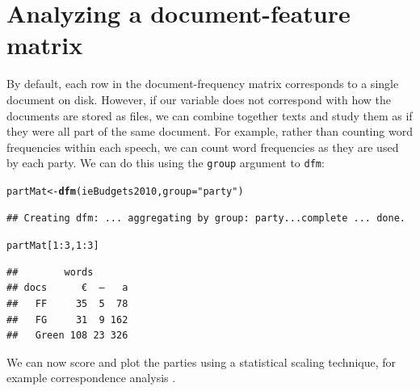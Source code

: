 \documentclass[11pt]{article}\usepackage[]{graphicx}\usepackage[]{color}
\makeatletter
\newcommand{\hlnum}[1]{\textcolor[rgb]{0.686,0.059,0.569}{#1}}%
\newcommand{\hlstr}[1]{\textcolor[rgb]{0.192,0.494,0.8}{#1}}%
\newcommand{\hlopt}[1]{\textcolor[rgb]{0,0,0}{#1}}%
\newcommand{\hlstd}[1]{\textcolor[rgb]{0.345,0.345,0.345}{#1}}%
\newcommand{\hlkwb}[1]{\textcolor[rgb]{0.69,0.353,0.396}{#1}}%
\newcommand{\hlkwc}[1]{\textcolor[rgb]{0.333,0.667,0.333}{#1}}%
\newcommand{\hlkwd}[1]{\textcolor[rgb]{0.737,0.353,0.396}{\textbf{#1}}}%
\newenvironment{kframe}{%
 \def\at@end@of@kframe{}%
 \ifinner\ifhmode%
  \def\at@end@of@kframe{\end{minipage}}%
  \begin{minipage}{\columnwidth}%
 \fi\fi%
 \def\FrameCommand##1{\hskip\@totalleftmargin \hskip-\fboxsep
 \colorbox{shadecolor}{##1}\hskip-\fboxsep
     \hskip-\linewidth \hskip-\@totalleftmargin \hskip\columnwidth}%
 \MakeFramed {\advance\hsize-\width
   \@totalleftmargin\z@ \linewidth\hsize
   \@setminipage}}%
 {\par\unskip\endMakeFramed%
 \at@end@of@kframe}
\newenvironment{knitrout}{}{} %
\makeatother
\begin{document}
\section{Analyzing a document-feature matrix}

By default, each row in the document-frequency matrix corresponds to a single document on disk. However, if our variable does not correspond with how the documents are stored as files, we can combine together texts and study them as if they were all part of the same document. For example, rather than counting word frequencies within each speech, we can count word frequencies as they are used by each party. We can do this using the \texttt{group} argument to \texttt{dfm}:

\begin{knitrout}\footnotesize
{}\color{fgcolor}\begin{kframe}
\begin{alltt}
\hlstd{partMat} \hlkwb{<-} \hlkwd{dfm}\hlstd{(ieBudgets2010,} \hlkwc{group}\hlstd{=}\hlstr{"party"}\hlstd{)}
\end{alltt}
\begin{verbatim}
## Creating dfm: ... aggregating by group: party...complete ... done.
\end{verbatim}
\begin{alltt}
\hlstd{partMat[}\hlnum{1}\hlopt{:}\hlnum{3}\hlstd{,}\hlnum{1}\hlopt{:}\hlnum{3}\hlstd{]}
\end{alltt}
\begin{verbatim}
##        words
## docs      €  —   a
##   FF     35  5  78
##   FG     31  9 162
##   Green 108 23 326
\end{verbatim}
\end{kframe}
\end{knitrout}

We can now score and plot the parties using a statistical scaling technique, for example correspondence analysis \citep{nenadic2007}. 
\end{document}
